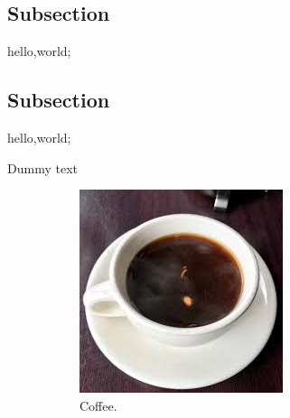 \documentclass{article}
\begin{document}
    \subsection{Subsection}
    hello,world;
    \subsection{Subsection}
    hello,world;
    
    Dummy text

\begin{figure}[h!]
  \centering

  \begin{subfigure}[b]{0.4\linewidth}
    \includegraphics[width=\linewidth]{coffee.jpg}
    \caption{Coffee.}
  \end{subfigure}
  \begin{subfigure}[b]{0.4\linewidth}

\end{subfigure}
\end{figure}
\end{document}
